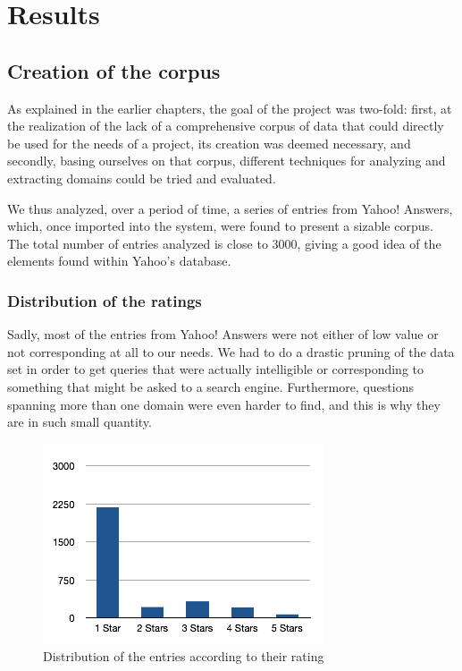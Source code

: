 \chapter{Results} %
\label{cha:results}

\section{Creation of the corpus} %
\label{sec:creation_of_the_corpus_results}

As explained in the earlier chapters, the goal of the project was two-fold: first, at the realization of the lack of a comprehensive corpus of data that could directly be used for the needs of a project, its creation was deemed necessary, and secondly, basing ourselves on that corpus, different techniques for analyzing and extracting domains could be tried and evaluated.

We thus analyzed, over a period of time, a series of entries from Yahoo! Answers, which, once imported into the system, were found to present a sizable corpus. The total number of entries analyzed is close to 3000, giving a good idea of the elements found within Yahoo's database.

\subsection{Distribution of the ratings} %
\label{sub:distribution_of_the_ratings}

Sadly, most of the entries from Yahoo! Answers were not either of low value or not corresponding at all to our needs. We had to do a drastic pruning of the data set in order to get queries that were actually intelligible or corresponding to something that might be asked to a search engine. Furthermore, questions spanning more than one domain were even harder to find, and this is why they are in such small quantity.

\begin{figure}[ht!]
  \begin{center}
    \includegraphics[width=\linewidth]{images/entriesdistribution}
  \end{center}
  \caption{Distribution of the entries according to their rating}\label{fig:entries_distribution}
\end{figure}

